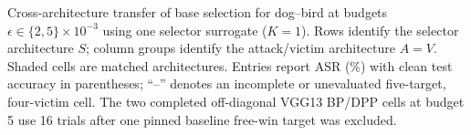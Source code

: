 \begin{table}[t]
\centering
\caption{
Cross-architecture transfer of base selection for dog--bird at budgets
$\epsilon\in\{2,5\}\times10^{-3}$ using one selector surrogate ($K=1$).
Rows identify the selector architecture $S$; column groups identify the
attack/victim architecture $A=V$. Shaded cells are matched architectures.
Entries report ASR (\%) with clean test accuracy in parentheses; ``--''
denotes an incomplete or unevaluated five-target, four-victim cell. The two completed off-diagonal VGG13 BP/DPP cells at budget 5 use 16 trials after one pinned baseline free-win target was excluded.
}
\vspace{-0.5em}
\label{tab:cross-architecture-k1}

\setlength{\tabcolsep}{3pt}
\renewcommand{\arraystretch}{1.08}


\end{table}
